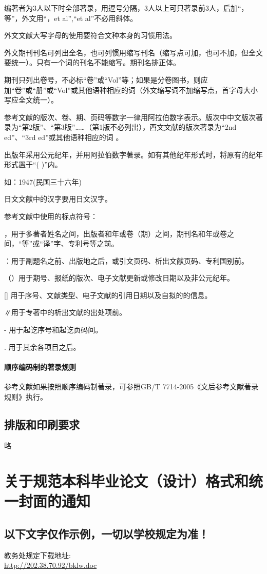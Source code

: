 编著者为3人以下时全部著录，用逗号分隔，3人以上可只著录前3人，后加“，等”，外文用“，et al”,“et al”不必用斜体。

外文文献大写字母的使用要符合文种本身的习惯用法。

外文期刊刊名可列出全名，也可列惯用缩写刊名（缩写点可加，也可不加，但全文要统一）。只有一个词的刊名不能缩写。期刊名排正体。

期刊只列出卷号，不必标“卷”或“Vol”等；如果是分卷图书，则应加“卷”或“册”或“Vol”或其他语种相应的词（外文缩写词不加缩写点，首字母大小写应全文统一）。

参考文献的版次、卷、期、页码等数字一律用阿拉伯数字表示。版次中中文版次著录为“第2版”、“第3版”……（第1版不必列出），西文文献的版次著录为“2nd ed”、“3rd ed”或其他语种相应的词 。

出版年采用公元纪年，并用阿拉伯数字著录。如有其他纪年形式时，将原有的纪年形式置于“( )”内。

如：1947(民国三十六年)

日文文献中的汉字要用日文汉字。

参考文献中使用的标点符号：

，用于多著者姓名之间，出版者和年或卷（期）之间，期刊名和年或卷之间，“等”或“译”字、专利号等之前。

：用于副题名之前、出版地之后，或引文页码、析出文献页码、专利国别前。

（）用于期号、报纸的版次、电子文献更新或修改日期以及非公元纪年。

[] 用于序号、文献类型、电子文献的引用日期以及自拟的的信息。

∥用于专著中的析出文献的出处项前。

- 用于起讫序号和起讫页码间。

. 用于其余各项目之后。

\subsubsection{顺序编码制的著录规则}
参考文献如果按照顺序编码制著录，可参照GB/T 7714-2005《文后参考文献著录规则》执行。

\section{排版和印刷要求}略


\chapter{关于规范本科毕业论文（设计）格式和统一封面的通知}
\section*{以下文字仅作示例，一切以学校规定为准！}
教务处规定下载地址:\\
\url{http://202.38.70.92/bklw.doc}

